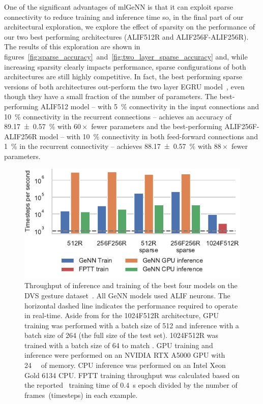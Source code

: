 \documentclass[sigconf]{acmart}
\begin{document}
One of the significant advantages of mlGeNN is that it can exploit sparse connectivity to reduce training and inference time so, in the final part of our architectural exploration, we explore the effect of sparsity on the performance of our two best performing architectures (ALIF512R and ALIF256F-ALIF256R).
The results of this exploration are shown in figures~\ref{fig:sparse_accuracy}~and~\ref{fig:two_layer_sparse_accuracy} and, while increasing sparsity clearly impacts performance, sparse configurations of both architectures are still highly competitive.
In fact, the best performing sparse versions of both architectures out-perform the two layer EGRU model~\citep{subramoney2022egru}, even though they have a small fraction of the number of parameters.
The best-performing ALIF512 model -- with \SI{5}{\percent} connectivity in the input connections and \SI{10}{\percent} connectivity in the recurrent connections -- achieves an accuracy of \SI{89.17 \pm 0.57}{\percent} with $60\times$ fewer parameters and the best-performing ALIF256F-ALIF256R model -- with \SI{10}{\percent} connectivity in both feed-forward connections and \SI{1}{\percent} in the recurrent connectivity -- achieves \SI{88.17 \pm 0.57}{\percent} with $88\times$ fewer parameters.

\begin{figure}[t]
  \centering
  \includegraphics{figures/performance.pdf}
  \caption{Throughput of inference and training of the best four models on the DVS gesture dataset~\citep{amir_low_2017}.
  All GeNN models used ALIF neurons.
  The horizontal dashed line indicates the performance required to operate in real-time.
  Aside from for the 1024F512R architecture, GPU training was performed with a batch size of 512 and inference with a batch size of 264 (the full size of the test set).
  1024F512R was trained with a batch size of 64 to match \citet{yin2021accurate}.
  GPU training and inference were performed on an NVIDIA RTX A5000 GPU with \SI{24}{\giga\byte} of memory.
  CPU inference was performed on an Intel Xeon Gold 6134 CPU.
  FPTT training throughput was calculated based on the reported~\citep{yin2021accurate} training time of \SI{0.4}{\second} epoch divided by the number of frames~(timesteps) in each example.}
  \label{fig:performance}
\end{figure}
\end{document}
